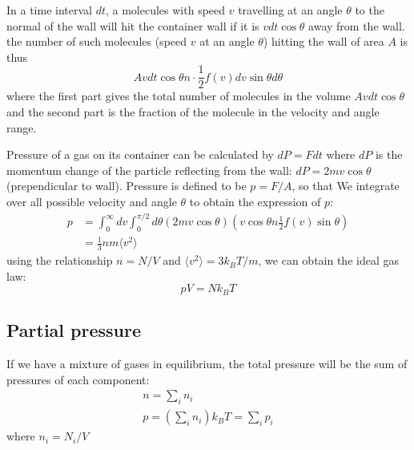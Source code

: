 \documentclass{article}
\begin{document}
In a time interval $dt$, 
a molecules with speed $v$ travelling at an angle $\theta$ to the normal of the wall
will hit the container wall if it is $vdt\cos \theta$ away from the wall. 
the number of such molecules (speed $v$ at an angle $\theta$) 
hitting the wall of area $A$ is thus 
\begin{equation}
    A vdt\cos \theta n \cdot \frac{1}{2} f(v) dv \sin\theta d\theta 
\end{equation}
where the first part gives the total number of molecules in the volume $A vdt\cos \theta$ and 
the second part is the fraction of the molecule in the velocity and angle range.

Pressure of a gas on its container can be calculated by $dP = F dt$ where $dP$ is the momentum 
change of the particle reflecting from the wall: $dP = 2 mv \cos\theta$ (prependicular to wall). 
Pressure is defined to be $p = F/A$, so that 
We integrate over all possible velocity and angle $\theta$ to obtain the expression of $p$:
\begin{align}
    p &= \int_0^{\infty} dv \int_0^{\pi/2} d\theta  ( 2 mv \cos\theta ) 
    \left( v \cos \theta n \frac{1}{2} f(v) \sin\theta \right) \\
    &= \frac{1}{3} n m \langle v^2 \rangle
\end{align}
using the relationship $n = N/V$ and $\langle v^2 \rangle = 3k_BT / m$, we 
can obtain the ideal gas law:
\begin{equation}
    pV = N k_B T
\end{equation}

\subsection*{Partial pressure}
If we have a mixture of gases in equilibrium, the total pressure will be the 
sum of pressures of each component:
\begin{gather}
    n = \sum_i n_i \\
    p = \left( \sum_i n_i \right) k_B T = \sum_i p_i
\end{gather}
where $n_i = N_i / V$
\end{document}
